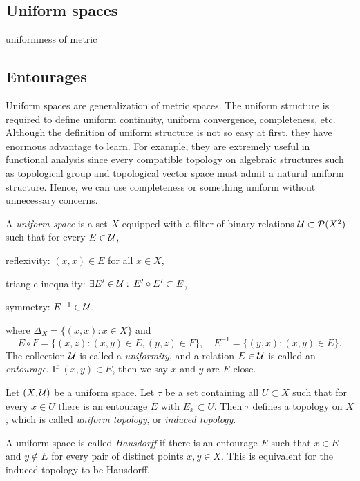 \subsection{Uniform spaces}
uniformness of metric


\subsection{Entourages}


Uniform spaces are generalization of metric spaces.
The uniform structure is required to define uniform continuity, uniform convergence, completeness, etc.
Although the definition of uniform structure is not so easy at first, they have enormous advantage to learn.
For example, they are extremely useful in functional analysis since every compatible topology on algebraic structures such as topological group and topological vector space must admit a natural uniform structure.
Hence, we can use completeness or something uniform without unnecessary concerns.

\begin{defn}
A \emph{uniform space} is a set $X$ equipped with a filter of binary relations $\mathcal{U}\subset\mathcal{P}(X^2)$ such that for every $E\in\mathcal{U}$,
\begin{cond}
\item reflexivity: $(x,x)\in E$ for all $x\in X$,
\item triangle inequality: $\exists E'\in\mathcal{U}:\,E'\circ E'\subset E$,
\item symmetry: $E^{-1}\in\mathcal{U}$,
\end{cond}
where $\Delta_X=\{(x,x):x\in X\}$ and
\[E\circ F=\{(x,z):(x,y)\in E,(y,z)\in F\},\quad E^{-1}=\{(y,x):(x,y)\in E\}.\]
The collection $\mathcal{U}$ is called a \emph{uniformity}, and a relation $E\in\mathcal{U}$ is called an \emph{entourage}.
If $(x,y)\in E$, then we say $x$ and $y$ are $E$-close.
\end{defn}
\begin{defn}
Let $(X,\mathcal{U})$ be a uniform space.
Let $\tau$ be a set containing all $U\subset X$ such that for every $x\in U$ there is an entourage $E$ with $E_x\subset U$.
Then $\tau$ defines a topology on $X$, which is called \emph{uniform topology}, or \emph{induced topology}.
\end{defn}
\begin{defn}
A uniform space is called \emph{Hausdorff} if there is an entourage $E$ such that $x\in E$ and $y\notin E$ for every pair of distinct points $x,y\in X$.
This is equivalent for the induced topology to be Hausdorff.
\end{defn}


